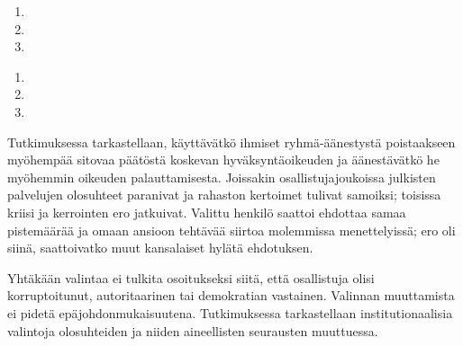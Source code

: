 \begin{enumerate}
  \item {}
  \item {}
  \item {}
\end{enumerate}
\begin{enumerate}[resume]
  \item {}
  \item {}
  \item {}
\end{enumerate}

Tutkimuksessa tarkastellaan, käyttävätkö ihmiset ryhmä-äänestystä poistaakseen myöhempää sitovaa päätöstä koskevan hyväksyntäoikeuden ja äänestävätkö he myöhemmin oikeuden palauttamisesta. Joissakin osallistujajoukoissa julkisten palvelujen olosuhteet paranivat ja rahaston kertoimet tulivat samoiksi; toisissa kriisi ja kerrointen ero jatkuivat. Valittu henkilö saattoi ehdottaa samaa pistemäärää ja omaan ansioon tehtävää siirtoa molemmissa menettelyissä; ero oli siinä, saattoivatko muut kansalaiset hylätä ehdotuksen.

Yhtäkään valintaa ei tulkita osoitukseksi siitä, että osallistuja olisi korruptoitunut, autoritaarinen tai demokratian vastainen. Valinnan muuttamista ei pidetä epäjohdonmukaisuutena. Tutkimuksessa tarkastellaan institutionaalisia valintoja olosuhteiden ja niiden aineellisten seurausten muuttuessa.


